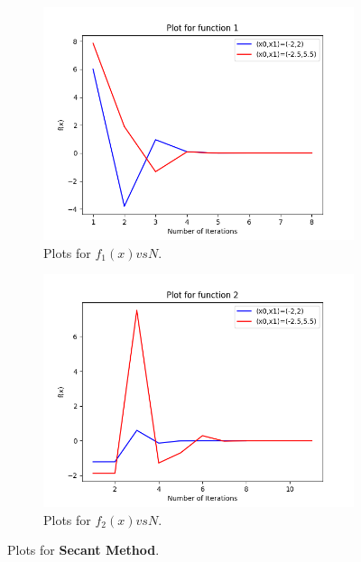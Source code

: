 \documentclass[a4paper, 12pt]{report}
\begin{document}
\begin{figure}[h]
\centering
\begin{subfigure}{.55\textwidth}
  \centering
  \includegraphics[width=.95\linewidth]{SM1.png}
  \caption{Plots for $f_{1}(x) vs N$.}
\end{subfigure}%
\begin{subfigure}{.55\textwidth}
  \centering
  \includegraphics[width=.95\linewidth]{SM2.png}
  \caption{Plots for $f_{2}(x) vs N$.}
\end{subfigure}
\caption{Plots for \textbf{Secant Method}.}
\label{fig:Plot3}
\end{figure}
\end{document}
